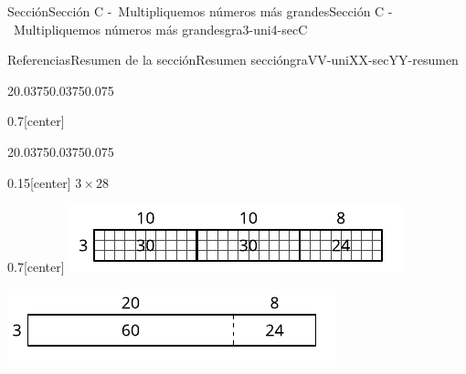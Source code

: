 \documentclass[twoside,10pt,]{article}
\begin{document}
\begin{sectionptx}{Sección}{Sección C -~Multipliquemos números más grandes}{}{Sección C -~Multipliquemos números más grandes}{}{}{gra3-uni4-secC}
\begin{references-subsection}{Referencias}{Resumen de la sección}{}{Resumen sección}{}{}{graVV-uniXX-secYY-resumen}
\begin{sidebyside}{2}{0.0375}{0.0375}{0.075}
\begin{sbspanel}{0.7}[center]
\end{sbspanel}%
\end{sidebyside}%
\begin{sidebyside}{2}{0.0375}{0.0375}{0.075}%
\begin{sbspanel}{0.15}[center]%
\(3\times 28\)%
\end{sbspanel}%
\begin{sbspanel}{0.7}[center]%
\includegraphics[width=\linewidth]{external/svg-source/tikz-file-141827.pdf}
\par
\includegraphics[width=\linewidth]{external/svg-source/tikz-file-158683.pdf}
\end{sbspanel}%
\end{sidebyside}%
\end{references-subsection}
\end{sectionptx}
%
%
\typeout{************************************************}
\typeout{************************************************}
%
\end{document}
